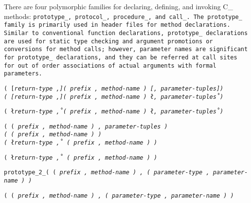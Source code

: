 \def\Subsection#1{\subsection{#1}}

There are four polymorphic families for declaring, defining, and invoking
C\_ methods: \tt{prototype_}, \tt{protocol_}, \tt{procedure_}, and \tt{call_}.
The \tt{prototype_} family is primarily used
in header files for method declarations.
Similar to conventional function declarations, \tt{prototype_}
declarations are used for static type checking and argument promotions
or conversions for method calls; however, parameter names are significant
for \tt{prototype_} declarations, and they can be referred at call sites
for out of order associations of actual arguments with formal parameters.


\s\s\s\s\s\tt{(} [\it{return-type} \tt{,}]\s\tt{(} \it{prefix}
\tt{,} \it{method-name} \tt{)} [\tt{,} \it{parameter-tuples}]\s\tt{)}\\

\s\s\s\tt{(} [\it{return-type} \tt{,}]\s\tt{(} \it{prefix}
\tt{,} \it{method-name} \tt{)} \l\tt{,} \it{parameter-tuples}\r\s\tt{)}

\s\tt{(} \l\it{return-type} \tt{,}\r\s\tt{(}
\it{prefix} \tt{,} \it{method-name} \tt{)} \l\tt{,} \it{parameter-tuples}\r\s\tt{)}

\s\tt{(}   \tt{(} \it{prefix}
\tt{,} \it{method-name} \tt{)} \tt{,} \it{parameter-tuples} \tt{)}\\

\s\s\s\tt{(} \tt{(} \it{prefix}
\tt{,} \it{method-name} \tt{)} \tt{)}\\

\s\s\s\tt{(} \l\it{return-type} \tt{,}\r\s
\tt{(} \it{prefix} \tt{,} \it{method-name} \tt{)} \tt{)}

\s\tt{(} \l\it{return-type} \tt{,}\r\s
\tt{(} \it{prefix} \tt{,} \it{method-name} \tt{)} \tt{)}

\tt {prototype_2_}\s\s\s\tt{(} \tt{(} \it{prefix} \tt{,} \it{method-name} \tt{)}
\tt{,} \tt{(} \it{parameter-type} \tt{,} \it{parameter-name} \tt{)} \tt{)}

\s\tt{(} \tt{(} \it{prefix} \tt{,} \it{method-name} \tt{)}
\tt{,} \tt{(} \it{parameter-type} \tt{,} \it{parameter-name} \tt{)} \tt{)}

